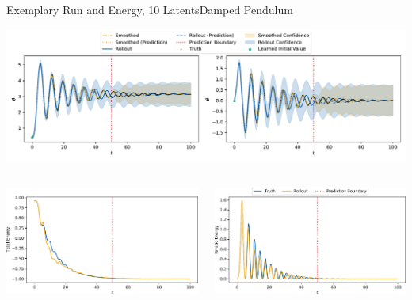 \documentclass[
	aspectratio=43,
	color={accentcolor=1c},
	logo=false,
	colorframetitle=true,
	handout
]{tudabeamer}
\begin{document}
			\begin{frame}[c]{Exemplary Run and Energy, 10 Latents}{Damped Pendulum}
				\begin{center}
					\includegraphics[width=\linewidth]{figures/experiments/pendulum-damped/rollout-observations-N0.pdf}
				\end{center}
				\vspace{-1cm}
				\begin{columns}
					\begin{column}{0.333\linewidth}
						\begin{center}
							\includegraphics[width=\linewidth]{figures/experiments/pendulum-damped/energy-R110-N0-total.pdf}
						\end{center}
					\end{column}
					\begin{column}{0.333\linewidth}
						\begin{center}
							\includegraphics[width=\linewidth]{figures/experiments/pendulum-damped/energy-R110-N0-kinetic.pdf}

\end{center}
\end{column}
\end{columns}
\end{frame}
\end{document}
